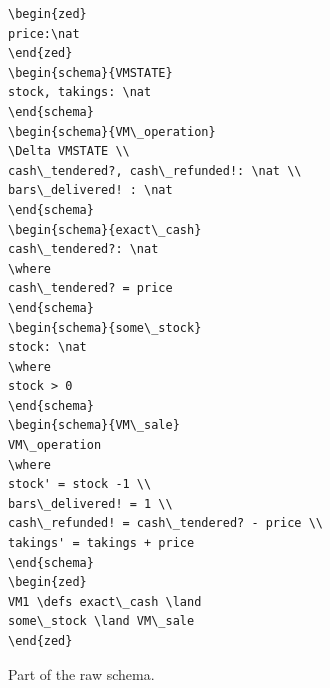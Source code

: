 \begin{figure}[H]
\vspace{-0.2in}
\centering
\begin{minipage}{0.45\textwidth}
\centering
\begin{tiny}
\begin{BVerbatim}
\begin{zed}
price:\nat
\end{zed}
\begin{schema}{VMSTATE}
stock, takings: \nat
\end{schema}
\begin{schema}{VM\_operation}
\Delta VMSTATE \\
cash\_tendered?, cash\_refunded!: \nat \\
bars\_delivered! : \nat
\end{schema}
\begin{schema}{exact\_cash}
cash\_tendered?: \nat
\where
cash\_tendered? = price
\end{schema}
\begin{schema}{some\_stock}
stock: \nat
\where
stock > 0
\end{schema}
\begin{schema}{VM\_sale}
VM\_operation
\where
stock' = stock -1 \\
bars\_delivered! = 1 \\
cash\_refunded! = cash\_tendered? - price \\
takings' = takings + price
\end{schema}
\begin{zed}
VM1 \defs exact\_cash \land 
some\_stock \land VM\_sale
\end{zed}
\end{BVerbatim}
\end{tiny}
\vspace{-0.18in}
\caption{Part of the raw schema.\label{fig:rawschema}}
\vspace{-0.2in}
\end{minipage}\hfill
\begin{minipage}{0.45\textwidth}
\centering

\end{minipage}
\end{figure}

